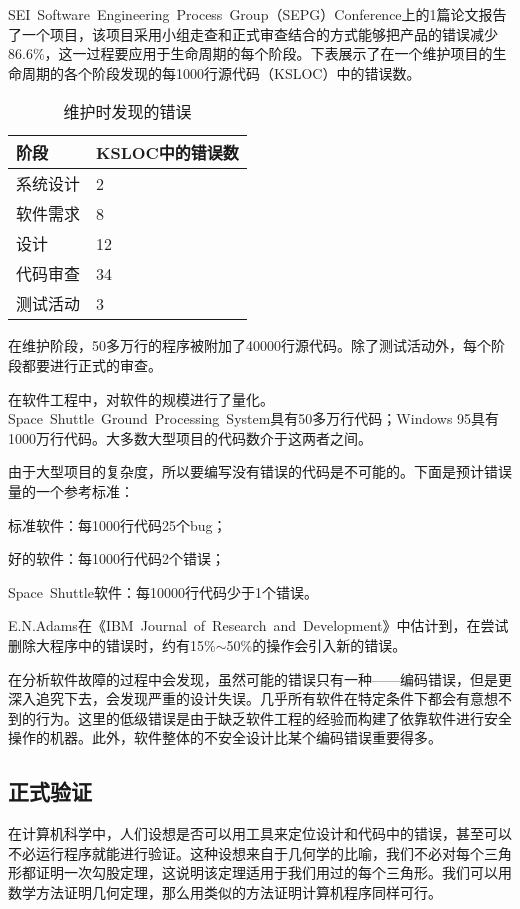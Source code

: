 SEI~Software~Engineering~Process~Group（SEPG）Conference上的1篇论文报告了一个项目，该项目采用小组走查和正式审查结合的方式能够把产品的错误减少86.6\%，这一过程要应用于生命周期的每个阶段。下表展示了在一个维护项目的生命周期的各个阶段发现的每1000行源代码（KSLOC）中的错误数。
\begin{table}[!h]
\centering
\caption{维护时发现的错误}
\begin{tabular}{|l|l|}
\hline
阶段					& KSLOC中的错误数				\\
\hline
系统设计				& 2								\\
\hline
软件需求				& 8								\\
\hline
设计					& 12								\\
\hline
代码审查				& 34								\\
\hline
测试活动				& 3								\\
\hline
\end{tabular}
\end{table}

在维护阶段，50多万行的程序被附加了40000行源代码。除了测试活动外，每个阶段都要进行正式的审查。

在软件工程中，对软件的规模进行了量化。Space~Shuttle~Ground~Processing~System具有50多万行代码；Windows 95具有1000万行代码。大多数大型项目的代码数介于这两者之间。

由于大型项目的复杂度，所以要编写没有错误的代码是不可能的。下面是预计错误量的一个参考标准：
\begin{compactitem}
\item 标准软件：每1000行代码25个bug；
\item 好的软件：每1000行代码2个错误；
\item Space~Shuttle软件：每10000行代码少于1个错误。
\end{compactitem}

E.N.Adams在《IBM~Journal~of~Research~and~Development》中估计到，在尝试删除大程序中的错误时，约有15\%$\sim$50\%的操作会引入新的错误。

在分析软件故障的过程中会发现，虽然可能的错误只有一种——编码错误，但是更深入追究下去，会发现严重的设计失误。几乎所有软件在特定条件下都会有意想不到的行为。这里的低级错误是由于缺乏软件工程的经验而构建了依靠软件进行安全操作的机器。此外，软件整体的不安全设计比某个编码错误重要得多。

\subsection{正式验证}

在计算机科学中，人们设想是否可以用工具来定位设计和代码中的错误，甚至可以不必运行程序就能进行验证。这种设想来自于几何学的比喻，我们不必对每个三角形都证明一次勾股定理，这说明该定理适用于我们用过的每个三角形。我们可以用数学方法证明几何定理，那么用类似的方法证明计算机程序同样可行。

